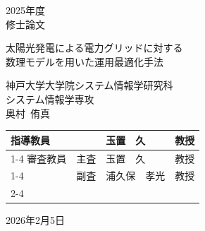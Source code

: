 
\newcommand{\hdate}[1]{\setcounter{page}{0}\begin{center}{\LARGE
#1\\}\vskip 10pt {\Huge 修士論文}\end{center}\vskip 40pt}


\newcommand{\htitle}[1]{
        \begin{center}
                \vskip 16pt
                {\LARGE #1}\\
                \setlength{\unitlength}{1mm}
        \end{center}
        \vskip 40pt
}

\begin{titlepage}
\vspace*{2cm}
\hdate{2025年度}
\htitle{太陽光発電による電力グリッドに対する\\数理モデルを用いた運用最適化手法}

\hspace{8cm}
\begin{center}
\Large

神戸大学大学院システム情報学研究科\\
システム情報学専攻\\

\vskip 20pt
奥村~侑真\\
\vskip 50pt

\begin{tabular}{llll}
指導教員 & & {\Large 玉置　久} & 教授 \\ \cline{1-4}
審査教員 & 主査 & {\Large 玉置　久} & 教授 \\ \cline{1-4}
         & 副査 & {\Large 浦久保　孝光} & 教授 \\ \cline{2-4}
\end{tabular}

\vskip 40pt

2026年2月5日
\end{center}
\end{titlepage}